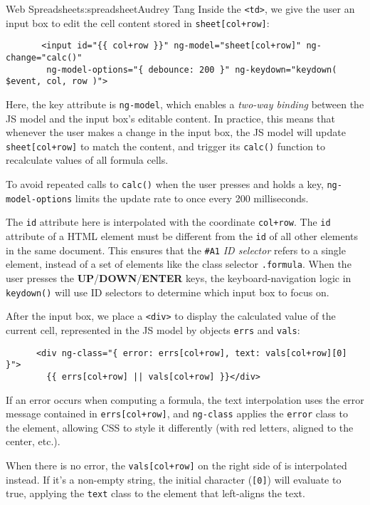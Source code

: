 \begin{aosachapter}{Web Spreadsheet}{s:spreadsheet}{Audrey Tang}
Inside the \texttt{\textless{}td\textgreater{}}, we give the user an
input box to edit the cell content stored in
\texttt{sheet{[}col+row{]}}:

\begin{verbatim}
       <input id="{{ col+row }}" ng-model="sheet[col+row]" ng-change="calc()"
        ng-model-options="{ debounce: 200 }" ng-keydown="keydown( $event, col, row )">
\end{verbatim}

Here, the key attribute is \texttt{ng-model}, which enables a
\emph{two-way binding} between the JS model and the input box's editable
content. In practice, this means that whenever the user makes a change
in the input box, the JS model will update \texttt{sheet{[}col+row{]}}
to match the content, and trigger its \texttt{calc()} function to
recalculate values of all formula cells.

To avoid repeated calls to \texttt{calc()} when the user presses and
holds a key, \texttt{ng-model-options} limits the update rate to once
every 200 milliseconds.

The \texttt{id} attribute here is interpolated with the coordinate
\texttt{col+row}. The \texttt{id} attribute of a HTML element must be
different from the \texttt{id} of all other elements in the same
document. This ensures that the \texttt{\#A1} \emph{ID selector} refers
to a single element, instead of a set of elements like the class
selector \texttt{.formula}. When the user presses the
\textbf{UP}/\textbf{DOWN}/\textbf{ENTER} keys, the keyboard-navigation
logic in \texttt{keydown()} will use ID selectors to determine which
input box to focus on.

After the input box, we place a \texttt{\textless{}div\textgreater{}} to
display the calculated value of the current cell, represented in the JS
model by objects \texttt{errs} and \texttt{vals}:

\begin{verbatim}
      <div ng-class="{ error: errs[col+row], text: vals[col+row][0] }">
        {{ errs[col+row] || vals[col+row] }}</div>
\end{verbatim}

If an error occurs when computing a formula, the text interpolation uses
the error message contained in \texttt{errs{[}col+row{]}}, and
\texttt{ng-class} applies the \texttt{error} class to the element,
allowing CSS to style it differently (with red letters, aligned to the
center, etc.).

When there is no error, the \texttt{vals{[}col+row{]}} on the right side
of \texttt{\textbar{}\textbar{}} is interpolated instead. If it's a
non-empty string, the initial character (\texttt{{[}0{]}}) will evaluate
to true, applying the \texttt{text} class to the element that
left-aligns the text.


\end{aosachapter}
